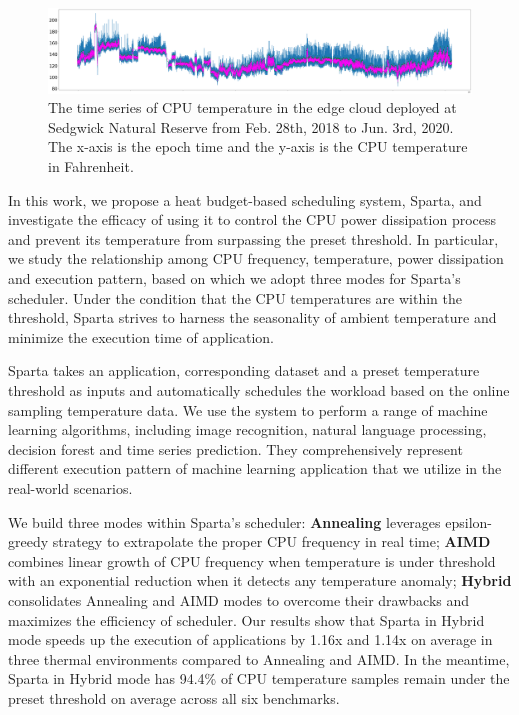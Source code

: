 \begin{figure}
\includegraphics[width=\textwidth]{figures/time_series.png}
\caption{The time series of CPU temperature in the edge cloud deployed at Sedgwick Natural Reserve from Feb. 28th, 2018 to Jun. 3rd, 2020. The x-axis is the epoch time and the y-axis is the CPU temperature in Fahrenheit. } \label{fig:time_series}
\end{figure}

In this work, we propose a heat budget-based scheduling system, Sparta, and investigate the efficacy of using it to control the CPU power dissipation process and prevent its temperature from surpassing the preset threshold. In particular, we study the relationship among CPU frequency, temperature, power dissipation and execution pattern, based on which we adopt three modes for Sparta's scheduler. Under the condition that the CPU temperatures are within the threshold, Sparta strives to harness the seasonality of ambient temperature and minimize the execution time of application.

Sparta takes an application, corresponding dataset and a preset temperature threshold as inputs and automatically schedules the workload based on the online sampling temperature data. We use the system to perform a range of machine learning algorithms, including image recognition, natural language processing, decision forest and time series prediction. They comprehensively represent different execution pattern of machine learning application that we utilize in the real-world scenarios.

We build three modes within Sparta's scheduler: \textbf{Annealing} leverages epsilon-greedy strategy to extrapolate the proper CPU frequency in real time; \textbf{AIMD} combines linear growth of CPU frequency when temperature is under threshold with an exponential reduction when it detects any temperature anomaly; \textbf{Hybrid} consolidates Annealing and AIMD modes to overcome their drawbacks and maximizes the efficiency of scheduler. Our results show that Sparta in Hybrid mode speeds up the execution of applications by 1.16x and 1.14x on average in three thermal environments compared to Annealing and AIMD. In the meantime, Sparta in Hybrid mode has 94.4\% of CPU temperature samples remain under the preset threshold on average across all six benchmarks. 

